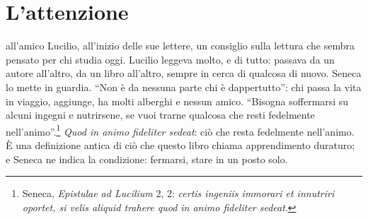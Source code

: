 %
\chapter{L'attenzione}
\label{cap:attenzione}


 all'amico Lucilio, all'inizio delle sue
lettere, un consiglio sulla lettura che sembra pensato per chi studia
oggi. Lucilio leggeva molto, e di tutto: passava da un autore all'altro,
da un libro all'altro, sempre in cerca di qualcosa di nuovo. Seneca lo
mette in guardia. \enquote{Non è da nessuna parte chi è dappertutto}:
chi passa la vita in viaggio, aggiunge, ha molti alberghi e nessun
amico. \enquote{Bisogna soffermarsi su alcuni ingegni e nutrirsene, se
vuoi trarne qualcosa che resti fedelmente nell'animo}.\footnote{Seneca,
\emph{Epistulae ad Lucilium} 2, 2: \emph{certis ingeniis immorari et
innutriri oportet, si velis aliquid trahere quod in animo fideliter
sedeat}.} \emph{Quod in animo fideliter sedeat}: ciò che resta
fedelmente nell'animo. È una definizione antica di ciò che questo libro
chiama apprendimento duraturo; e Seneca ne indica la condizione:
fermarsi, stare in un posto solo.


